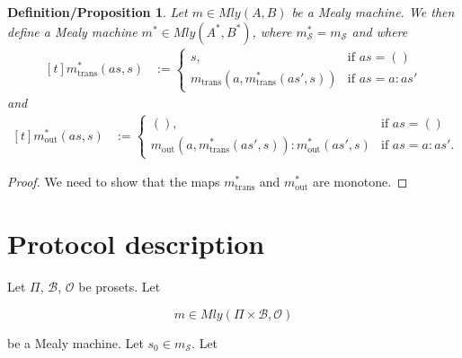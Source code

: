 \documentclass[runningheads]{llncs}
\newtheorem{defn}{Definition}
\newtheorem{defnprop}{Definition/Proposition}
\renewcommand{\S}{\mathcal{S}}
\newcommand{\B}{\mathcal{B}}
\renewcommand{\O}{\mathcal{O}}
\newcommand{\mly}[2]{Mly(#1, #2)}
\newcommand{\trans}[1]{#1_{\text{trans}}}
\newcommand{\out}[1]{#1_{\text{out}}}
\newcommand{\ms}[1]{#1_{\S}}
\begin{document}
\begin{defnprop}
  Let \(m \in \mly{A}{B}\) be a Mealy machine. We then define a
  Mealy machine \(m^* \in \mly{A^*}{B^*}\), where \(\ms{m^*} =
  \ms{m}\) and where
  \[
    \begin{aligned}[t]
      \trans{m^*}(as, s)
      & :=
      \begin{cases}

        s,      & \text{if \(as = ()\)}    \\
        \trans{m}\left(a, \trans{m^*}(as', s)\right) &
        \text{if \(as = a : as'\)}
      \end{cases}
  \end{aligned}\]
  and
  \[
    \begin{aligned}[t]
      \out{m^*}(as, s)
      & :=
      \begin{cases}

        (),      & \text{if \(as = ()\)}    \\
        \out{m}(a,\trans{m^*}(as',s)) : \out{m^*}(as',s) & \text{if
        \(as = a : as'\)}.
      \end{cases}
  \end{aligned}\]
\end{defnprop}

\begin{proof}
  We need to show that the maps \(\trans{m^*}\) and \(\out{m^*}\)
  are monotone.
\end{proof}


\section{Protocol description}

Let \(\Pi\), \(\B\), \(\O\) be prosets. Let

\[m \in \mly{\Pi \times \B}{\O}\]

be a Mealy machine. Let \(s_0 \in \ms{m}\). Let
\end{document}
